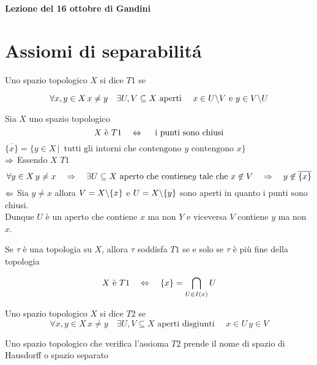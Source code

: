 

\textbf{Lezione del 16 ottobre di Gandini}
\section{Assiomi di separabilit\'a}

\begin{defn}
 Uno spazio topologico $X$ si dice $T1$ se
 
$$ \forall x,y\in X \, x \neq y \quad \exists U,V\subseteq X \text{ aperti } \quad x \in U \backslash V \text{ e } y \in V \backslash U $$
\end{defn}

\begin{prop}\bianco
 Sia $X$ uno spazio topologico
 $$ X \text{ \`e } T1 \quad \Leftrightarrow \quad \text{ i punti sono chiusi}$$
 \proof $\overline{\{x\}} = \{ y \in X \, \vert \, \text{ tutti gli intorni che contengono } y \text{ contengono } x \}$
\\ $\Rightarrow$ Essendo $X$ $T1$
$$ \forall y \in X \, y \neq x \quad \Rightarrow \quad \exists U \subseteq X \text{  aperto che contiene} y \text{ tale che }  x\not \in V  \quad \Rightarrow \quad y\not \in \overline{\{ x \}}$$
$\Leftarrow$ Sia $y\neq x $ allora $V=X\backslash \{x\}$ e $U=X\backslash\{y\}$ sono aperti in quanto i punti sono chiusi.\\
Dunque $U$ \`e un aperto che contiene $x$ ma non $Y$ e viceversa $V$ contiene $y$ ma non $x$.
\endproof
\end{prop}
\begin{oss}\label{cofT1}Se $\tau$ \`e una topologia su $X$, allora $\tau$ soddisfa $T1$ se e solo se $\tau$ \`e pi\`u fine della topologia 
\end{oss}
\spazio
\begin{ex}
$$ X \text{ \`e } T1 \quad \Leftrightarrow \quad \{ x \} = \bigcap_{U\in I(x)} U $$
\end{ex}
\spazio
\begin{defn}
 Uno spazio topologico $X$ si dice $T2$ se
$$ \forall x,y\in X \, x\neq y \quad \exists U,V \subseteq X \text{ aperti disgiunti } \quad x \in U \, y \in V $$
 \end{defn}
\begin{defn}
 Uno spazio topologico che verifica l'assioma $T2$ prende il nome di spazio di Hausdorff o spazio separato
\end{defn}
